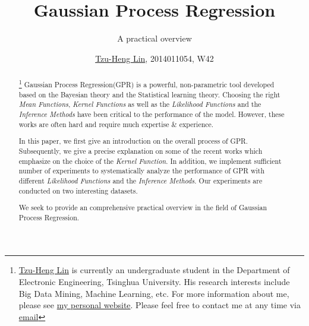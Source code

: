 \documentclass{sig-alternate-05-2015}
\begin{document}
\captionsetup[subfigure]{labelformat=empty}

\title{Gaussian Process Regression}
\subtitle{A practical overview}
\author{
    \alignauthor \color{blue}\href{http://lzhbrian.me}{Tzu-Heng Lin}\color{black}, 2014011054, W42\\
}


\maketitle
\begin{abstract}
\footnote{\color{blue}\href{http://lzhbrian.me}{Tzu-Heng Lin} \color{black} is currently an undergraduate student in the Department of Electronic Engineering, Tsinghua University. His research interests include Big Data Mining, Machine Learning, etc. For more information about me, please see \color{blue}\href{http://lzhbrian.me}{my personal website}\color{black}.
Please feel free to contact me at any time via \color{blue}\href{mailto:lzhbrian@gmail.com}{email} }
Gaussian Process Regression(GPR) is a powerful, non-parametric tool developed based on the Bayesian theory and the Statistical learning theory. Choosing the right \emph{Mean Functions}, \emph{Kernel Functions} as well as the \emph{Likelihood Functions} and the \emph{Inference Methods} have been critical to the performance of the model. However, these works are often hard and require much expertise \& experience.

In this paper, we first give an introduction on the overall process of GPR. 
Subsequently, we give a precise explanation on some of the recent works which emphasize on the choice of the \emph{Kernel Function}.
In addition, we implement sufficient number of experiments to systematically analyze the performance of GPR with different \emph{Likelihood Functions} and the \emph{Inference Methods}. Our experiments are conducted on two interesting datasets. 

We seek to provide an comprehensive practical overview in the field of Gaussian Process Regression.

\end{abstract}




%
%
\printccsdesc



\end{document}
